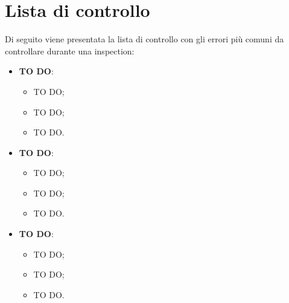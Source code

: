 %


\appendix
\section{Lista di controllo} %
\label{sec:lista_di_controllo}
Di seguito viene presentata la lista di controllo con gli errori più comuni da controllare durante una inspection:
	\begin{itemize}
		\item \textbf{TO DO}:
			\begin{itemize}
				\item TO DO;
				\item TO DO;
				\item TO DO.
			\end{itemize}
		\item \textbf{TO DO}:
			\begin{itemize}
				\item TO DO;
				\item TO DO;
				\item TO DO.
			\end{itemize}
		\item \textbf{TO DO}:
			\begin{itemize}
				\item TO DO;
				\item TO DO;
				\item TO DO.
			\end{itemize}
	\end{itemize}
